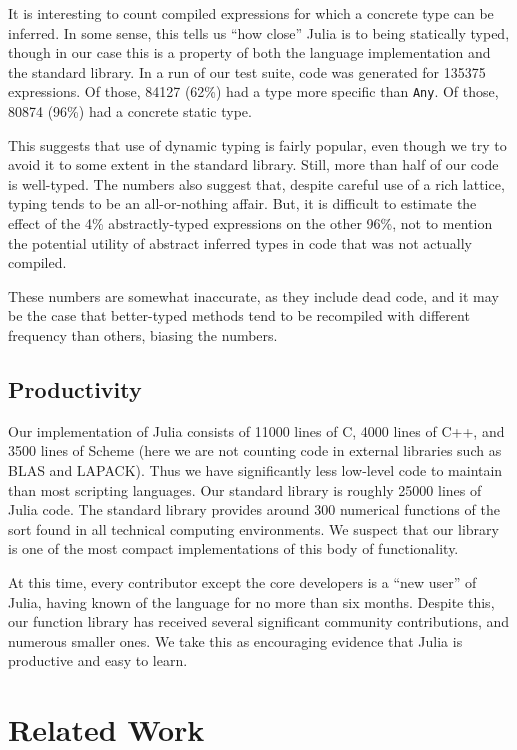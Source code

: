 \documentclass[9pt]{sigplanconf}
\begin{document}
It is interesting to count compiled expressions for which
a concrete type can be inferred. In some sense, this tells us ``how close''
Julia is to being statically typed, though in our case this is a property
of both the language implementation and the standard library.
In a run of our test suite, code was generated for 135375 expressions.
Of those, 84127 (62\%) had a type more specific than {\tt Any}. Of those,
80874 (96\%) had a concrete static type.

This suggests that use of dynamic typing is fairly popular, even though
we try to avoid it to some extent in the standard library. Still, more
than half of our code is well-typed. The numbers also suggest that,
despite careful use of a rich lattice, typing tends to be an all-or-nothing
affair. But, it is difficult to estimate the effect of the 4\%
abstractly-typed expressions on the other 96\%, not to mention the potential
utility of abstract inferred types in code that was not actually
compiled.

These numbers are somewhat inaccurate, as they include dead code, and
it may be the case that better-typed methods tend to be recompiled with
different frequency than others, biasing the numbers.


\subsection{Productivity}

Our implementation of Julia consists of 11000 lines of C, 4000 lines
of C++, and 3500 lines of Scheme (here we are not counting code in
external libraries such as BLAS and LAPACK).  Thus we have
significantly less low-level code to maintain than most scripting
languages.  Our standard library is roughly 25000 lines of Julia code.
The standard library provides around 300 numerical functions of the
sort found in all technical computing environments. We suspect that
our library is one of the most compact implementations of this body of
functionality.

At this time, every contributor except the core developers is a ``new
user'' of Julia, having known of the language for no more than six
months.  Despite this, our function library has received several
significant community contributions, and numerous smaller ones. We
take this as encouraging evidence that Julia is productive and easy to
learn.


\section{Related Work}
\end{document}
